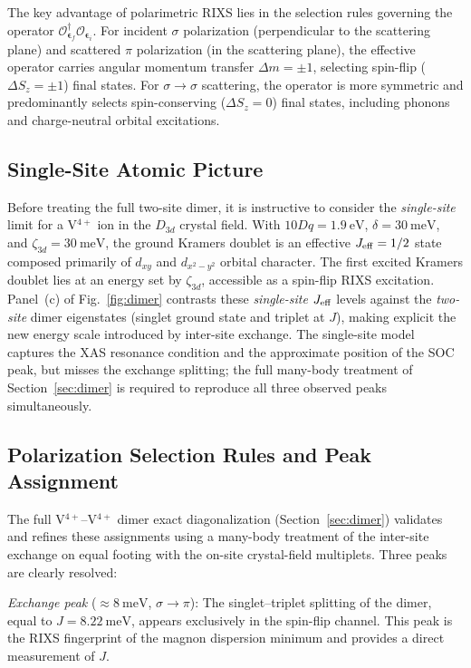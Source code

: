\documentclass[aps,prb,twocolumn,superscriptaddress,longbibliography]{revtex4-2}
\begin{document}
The key advantage of polarimetric RIXS lies in the selection rules governing
the operator $\mathcal{O}^\dagger_{\bm{\epsilon}_f} \mathcal{O}_{\bm{\epsilon}_i}$.
For incident $\sigma$ polarization (perpendicular to the scattering plane)
and scattered $\pi$ polarization (in the scattering plane), the effective
operator carries angular momentum transfer $\Delta m = \pm 1$, selecting
spin-flip ($\Delta S_z = \pm 1$) final states.
For $\sigma \to \sigma$ scattering, the operator is more symmetric and
predominantly selects spin-conserving ($\Delta S_z = 0$) final states,
including phonons and charge-neutral orbital excitations.

\subsection{Single-Site Atomic Picture}

Before treating the full two-site dimer, it is instructive to consider the
\emph{single-site} limit for a V$^{4+}$ ion in the $D_{3d}$ crystal field.
With $10Dq = \SI{1.9}{\eV}$, $\delta = \SI{30}{\milli\eV}$, and
$\zeta_{3d} = \SI{30}{\milli\eV}$, the ground Kramers doublet is an
effective $J_{\rm eff} = 1/2$ state composed primarily of $d_{xy}$ and
$d_{x^2-y^2}$ orbital character.
The first excited Kramers doublet lies at an energy set by $\zeta_{3d}$,
accessible as a spin-flip RIXS excitation.
Panel~(c) of Fig.~\ref{fig:dimer} contrasts these \emph{single-site}
$J_{\rm eff}$ levels against the \emph{two-site} dimer eigenstates
(singlet ground state and triplet at $J$), making explicit the new energy
scale introduced by inter-site exchange.
The single-site model captures the XAS resonance condition and the approximate
position of the SOC peak, but misses the exchange splitting; the full
many-body treatment of Section~\ref{sec:dimer} is required to reproduce
all three observed peaks simultaneously.

\subsection{Polarization Selection Rules and Peak Assignment}

The full V$^{4+}$--V$^{4+}$ dimer exact diagonalization (Section~\ref{sec:dimer})
validates and refines these assignments using a many-body treatment of the
inter-site exchange on equal footing with the on-site crystal-field multiplets.
Three peaks are clearly resolved:

\textit{Exchange peak} ($\approx \SI{8}{\milli\eV}$, $\sigma \to \pi$):
The singlet--triplet splitting of the dimer, equal to $J = \SI{8.22}{\milli\eV}$,
appears exclusively in the spin-flip channel.
This peak is the RIXS fingerprint of the magnon dispersion minimum and
provides a direct measurement of $J$.
\end{document}
